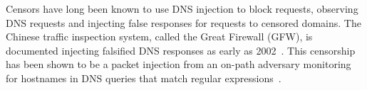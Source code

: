Censors have long been known to use DNS injection to block requests, observing
DNS requests and injecting false responses for requests to censored domains.
The Chinese traffic inspection system, called the Great Firewall (GFW), is
documented injecting falsified DNS responses as early as
2002~\cite{global2002great}. This censorship has been shown to be a packet
injection from an on-path adversary monitoring for hostnames in DNS queries
that match regular expressions~\cite{USESEC21:GFWatch}.

%

%

